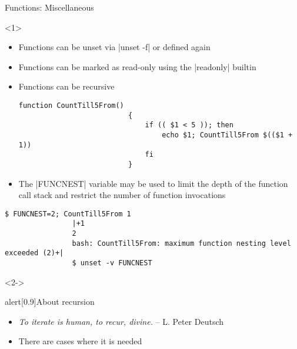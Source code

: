 \begin{frame}[fragile]{Functions: Miscellaneous}
    \vspace{-1mm}
    \begin{overlayarea}{\textwidth}{0.7\textheight}
        \begin{onlyenv}<1>
            \begin{itemize}
                \item Functions can be unset via \;\bash|unset -f|\; or defined again
                \item Functions can be marked as read-only using the \;\bash|readonly|\; builtin
                \item Functions can be recursive
                      \begin{lstlisting}[style=MyBash, xrightmargin=12mm, aboveskip=2mm, belowskip=-6mm]
                          function CountTill5From()
                          {
                              if (( $1 < 5 )); then
                                  echo $1; CountTill5From $(($1 + 1))
                              fi
                          }
                      \end{lstlisting}
                \item The \bash|FUNCNEST| variable may be used to limit the depth of the function call stack and restrict the number of function invocations
            \end{itemize}
            \begin{lstlisting}[style=MyBash, xrightmargin=-2mm, xleftmargin=2mm, numbers=none]
                $ FUNCNEST=2; CountTill5From 1
                |+1
                2
                bash: CountTill5From: maximum function nesting level exceeded (2)+|
                $ unset -v FUNCNEST
            \end{lstlisting}
        \end{onlyenv}
        \begin{onlyenv}<2->
            \vspace{-5mm}
            \begin{varblock}{alert}[0.9\textwidth]{About recursion}
                \begin{itemize}
                    \item \emph{\guillemotleft To iterate is human, to recur, divine.\guillemotright} -- L. Peter Deutsch
                    \item There are cases where it is needed

\end{itemize}
\end{varblock}
\end{onlyenv}
\end{overlayarea}
\end{frame}
